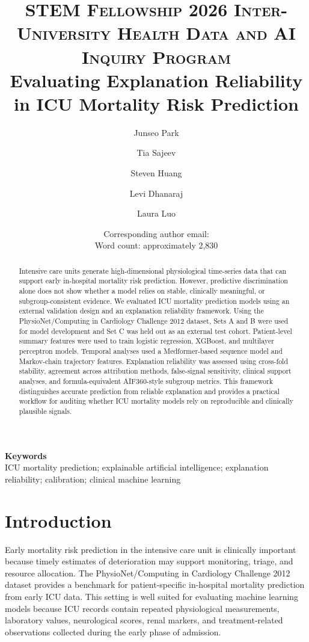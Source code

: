 \documentclass[10pt,twocolumn,letterpaper]{article}
\title{
        \usefont{OT1}{bch}{b}{n}
        \normalfont \normalsize \textsc{STEM Fellowship 2026 Inter-University Health Data and AI Inquiry Program} \\ [10pt]
        \huge Evaluating Explanation Reliability in ICU Mortality Risk Prediction \\
}
\author[1]{Junseo Park}
\author[2]{Tia Sajeev}
\author[3]{Steven Huang}
\author[4]{Levi Dhanaraj}
\author[5]{Laura Luo}
\affil[1]{The University of British Columbia}
\affil[2]{The University of British Columbia}
\affil[3]{The University of British Columbia}
\affil[4]{The University of British Columbia}
\affil[5]{The University of British Columbia}
\date{
\small
Corresponding author email: \underline{\hspace{6cm}}\\
Word count: approximately 2,830
}
\begin{document}
\maketitle

\begin{abstract}
Intensive care units generate high-dimensional physiological time-series data that can support early in-hospital mortality risk prediction. However, predictive discrimination alone does not show whether a model relies on stable, clinically meaningful, or subgroup-consistent evidence. We evaluated ICU mortality prediction models using an external validation design and an explanation reliability framework. Using the PhysioNet/Computing in Cardiology Challenge 2012 dataset, Sets A and B were used for model development and Set C was held out as an external test cohort. Patient-level summary features were used to train logistic regression, XGBoost, and multilayer perceptron models. Temporal analyses used a Medformer-based sequence model and Markov-chain trajectory features. Explanation reliability was assessed using cross-fold stability, agreement across attribution methods, false-signal sensitivity, clinical support analyses, and formula-equivalent AIF360-style subgroup metrics. This framework distinguishes accurate prediction from reliable explanation and provides a practical workflow for auditing whether ICU mortality models rely on reproducible and clinically plausible signals.
\end{abstract}

\vspace{0.5em}
{\textbf{Keywords} \\
ICU mortality prediction; explainable artificial intelligence; explanation reliability; calibration; clinical machine learning}

\section{Introduction}

Early mortality risk prediction in the intensive care unit is clinically important because timely estimates of deterioration may support monitoring, triage, and resource allocation. The PhysioNet/Computing in Cardiology Challenge 2012 dataset provides a benchmark for patient-specific in-hospital mortality prediction from early ICU data. This setting is well suited for evaluating machine learning models because ICU records contain repeated physiological measurements, laboratory values, neurological scores, renal markers, and treatment-related observations collected during the early phase of admission.
\end{document}
